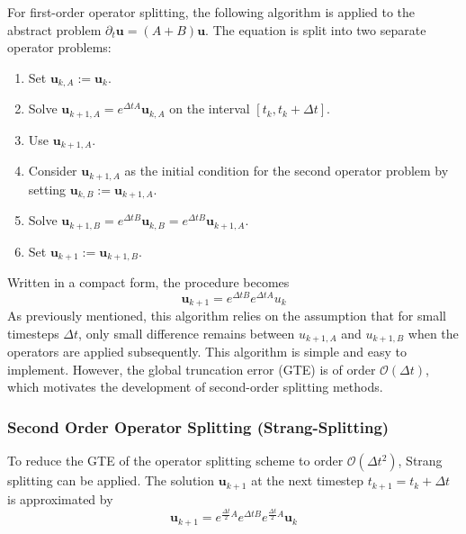 For first-order operator splitting, the following algorithm is applied to
the abstract problem $\partial_t \bm{u}= (A+B)\bm{u}$. The equation is
split into two separate operator problems:
\begin{enumerate}
    \item{Set $\bm{u}_{k,A}:= \bm{u}_k$.}
    \item{Solve $\bm{u}_{k+1, A} = e^{\Delta t A}\bm u_{k, A}$ on the
            interval $[t_{k}, t_k+\Delta t].$}
    \item{Use $\bm{u}_{k+1, A}$.}    
    \item{Consider $\bm{u}_{k+1, A}$ as the initial condition for the 
            second operator problem by setting
            $\bm{u}_{k,B}:=\bm{u}_{k+1,A}.$}
    \item{Solve $\bm{u}_{k+1, B} = e^{\Delta t B}\bm{u}_{k, B}
            =e^{\Delta t B}\bm{u}_{k+1, A}$.}
    \item {Set $\bm{u}_{k+1} := \bm{u}_{k+1,B}$.}
\end{enumerate}
Written in a compact form, the procedure becomes
$$\bm u_{k+1}= e^{\Delta t B}e^{\Delta t A}u_k$$
As previously mentioned, this algorithm relies on the assumption that for
small timesteps $\Delta t$, only small difference remains between 
$u_{k+1,A}$ and $u_{k+1,B}$ when the operators are applied subsequently.
This algorithm is simple and easy to implement. 
However, the global truncation error (GTE) is of order
$\mathcal{O}(\Delta t)$,  which motivates the
development of second-order splitting methods.

\subsubsection{Second Order Operator Splitting (Strang-Splitting)}
To reduce the GTE of the operator splitting scheme to order
$\mathcal{O}(\Delta t^2)$, Strang splitting can be applied. The solution
$\bm{u}_{k+1}$ at the next timestep $t_{k+1}=t_k +\Delta t$ is
approximated by
\begin{equation}
    \bm{u}_{k+1}=e^{\frac{\Delta t}{2}A} e^{\Delta t B}
        e^{\frac{\Delta t}{2}A} \bm{u}_k
\end{equation}

